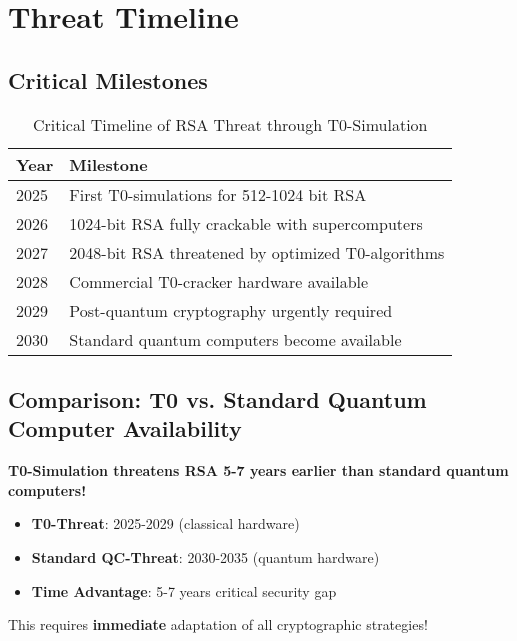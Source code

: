 \documentclass[12pt,a4paper]{article}
\begin{document}
	\section{Threat Timeline}
	
	\subsection{Critical Milestones}
	
	\begin{table}[htbp]
		\centering
		\begin{tabular}{lp{10cm}}
			\toprule
			\textbf{Year} & \textbf{Milestone} \\
			\midrule
			\rowcolor{red!20} 2025 & First T0-simulations for 512-1024 bit RSA \\
			\rowcolor{red!30} 2026 & 1024-bit RSA fully crackable with supercomputers \\
			\rowcolor{red!40} 2027 & 2048-bit RSA threatened by optimized T0-algorithms \\
			\rowcolor{orange!30} 2028 & Commercial T0-cracker hardware available \\
			\rowcolor{red!50} 2029 & Post-quantum cryptography urgently required \\
			\rowcolor{green!20} 2030 & Standard quantum computers become available \\
			\bottomrule
		\end{tabular}
		\caption{Critical Timeline of RSA Threat through T0-Simulation}
		\label{tab:threat_timeline}
	\end{table}
	
	\subsection{Comparison: T0 vs. Standard Quantum Computer Availability}
	
	\begin{tcolorbox}[colback=red!5!white,colframe=red!75!black,title=Critical Insight]
		\textbf{T0-Simulation threatens RSA 5-7 years earlier than standard quantum computers!}
		
		\begin{itemize}
			\item \textbf{T0-Threat}: 2025-2029 (classical hardware)
			\item \textbf{Standard QC-Threat}: 2030-2035 (quantum hardware)
			\item \textbf{Time Advantage}: 5-7 years critical security gap
		\end{itemize}
		
		This requires \textbf{immediate} adaptation of all cryptographic strategies!
	\end{tcolorbox}
	
\end{document}
